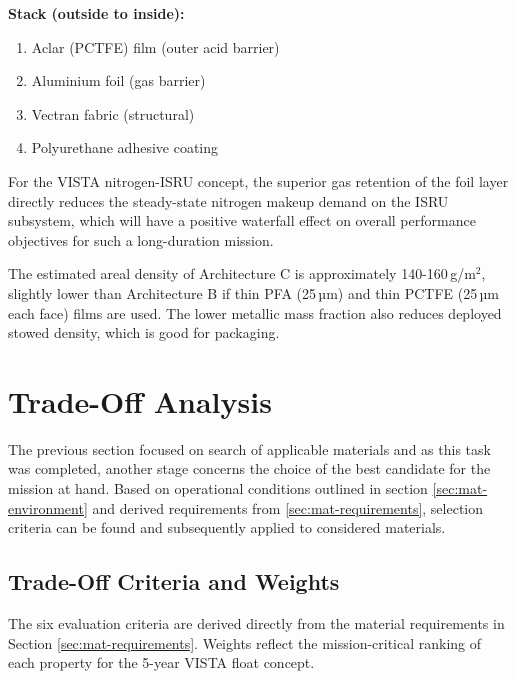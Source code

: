 \bigskip
\noindent
\begin{minipage}[t]{0.42\linewidth}
\textbf{Stack (outside to inside):}
\begin{enumerate}[parsep=0pt]
    \item Aclar (PCTFE) film (outer acid barrier)
    \item Aluminium foil (gas barrier)
    \item Vectran fabric (structural)
    \item Polyurethane adhesive coating
\end{enumerate}
\end{minipage}
\hfill
\begin{minipage}[t]{0.53\linewidth}
For the VISTA nitrogen-ISRU concept, the superior gas retention of the foil layer directly reduces the steady-state nitrogen makeup demand on the ISRU subsystem, which will have a positive waterfall effect on overall performance objectives for such a long-duration mission.
\end{minipage}

\medskip

\noindent The estimated areal density of Architecture C is approximately 140-160\,g/m$^2$, slightly lower than Architecture B if thin PFA (25\,µm) and thin PCTFE (25\,µm each face) films are used. The lower metallic mass fraction also reduces deployed stowed density, which is good for packaging.



\section{Trade-Off Analysis}
\label{sec:mat-tradeoff}

The previous section focused on search of applicable materials and as this task was completed, another stage concerns the choice of the best candidate for the mission at hand. Based on operational conditions outlined in section \ref{sec:mat-environment} and derived requirements from \ref{sec:mat-requirements}, selection criteria can be found and subsequently applied to considered materials.

\subsection{Trade-Off Criteria and Weights}
\label{ssec:tradeoff-criteria}

 The six evaluation criteria are derived directly from the material requirements in Section \ref{sec:mat-requirements}. Weights reflect the mission-critical ranking of each property for the 5-year VISTA float concept.

